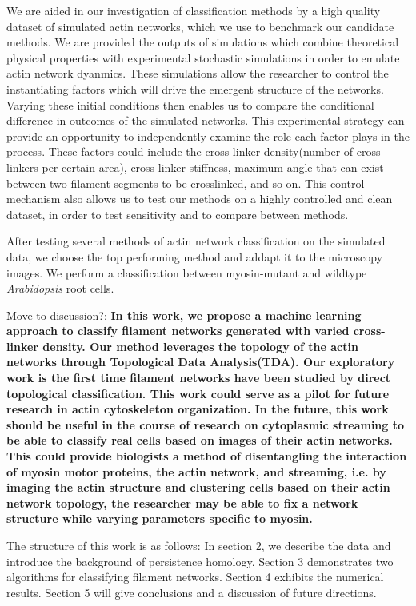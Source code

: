 \documentclass[10pt]{article}
\begin{document}
We are aided in our investigation of classification methods by a high quality dataset of simulated actin networks, which we use to benchmark our candidate methods. We are provided the outputs of simulations which combine theoretical physical properties with experimental stochastic simulations in order to emulate actin network dyanmics. These simulations allow the researcher to control the instantiating factors which will drive the emergent structure of the networks. Varying these initial conditions then enables us to compare the conditional difference in outcomes of the simulated networks. This experimental strategy can provide an opportunity to independently examine the role each factor plays in the process. These factors could include the cross-linker density(number of cross-linkers per certain area), cross-linker stiffness, maximum angle that can exist between two filament segments to be crosslinked, and so on\cite{freedman2017versatile,freedman2018nonequilibrium}. This control mechanism also allows us to test our methods on a highly controlled and clean dataset, in order to test sensitivity and to compare between methods.

After testing several methods of actin network classification on the simulated data, we choose the top performing method and addapt it to the microscopy images. We perform a classification between myosin-mutant and wildtype \textit{Arabidopsis} root cells.


Move to discussion?:
\textbf{In this work, we propose a machine learning approach to classify filament networks generated with varied cross-linker density. Our method leverages the topology of the actin networks through Topological Data Analysis(TDA). Our exploratory work is the first time filament networks have been studied by direct topological classification. This work could serve as a pilot for future research in actin cytoskeleton organization. In the future, this work should be useful in the course of research on cytoplasmic streaming to be able to classify real cells based on images of their actin networks. This could provide biologists a method of disentangling the interaction of myosin motor proteins, the actin network, and streaming, i.e. by imaging the actin structure and clustering cells based on their actin network topology, the researcher may be able to fix a network structure while varying parameters specific to myosin.
}


The structure of this work is as follows: In section 2, we describe the data and introduce the background of persistence homology. Section 3 demonstrates two algorithms for classifying filament networks. Section 4 exhibits the numerical results. Section 5 will give conclusions and a discussion of future directions.
\end{document}
